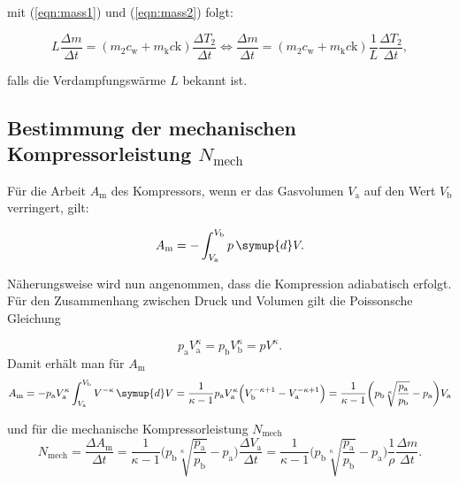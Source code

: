         mit (\ref{eqn:mass1}) und (\ref{eqn:mass2}) folgt:

        \begin{equation}
            L \frac{\Delta m}{\Delta t} = \left( m_2  c_\text{w} + m_\text{k} c\text{k}\right) \frac{\Delta T_2}{\Delta t} \iff \frac{\Delta m}{\Delta t} = \left( m_2  c_\text{w} + m_\text{k} c\text{k}\right) \frac{1}{L} \frac{\Delta T_2}{\Delta t},
        \end{equation}
        
        falls die Verdampfungswärme $L$ bekannt ist.


        \subsection{Bestimmung der mechanischen Kompressorleistung $N_\text{mech}$}

        Für die Arbeit $A_\text{m}$ des Kompressors, wenn er das Gasvolumen $V_\text{a}$ auf den Wert $V_\text{b}$ verringert, gilt:

        \begin{equation}
            A_\text{m} = - \int_{V_\text{a}}^{V_\text{b}} p \, \symup{d}V.
        \end{equation}

Näherungsweise wird nun angenommen, dass die Kompression adiabatisch erfolgt.
Für den Zusammenhang zwischen Druck und Volumen gilt die Poissonsche Gleichung

\begin{equation}
p_\text{a}V^\kappa_\text{a} = p_\text{b}V^\kappa_\text{b} = pV^\kappa.
\end{equation}
Damit erhält man für $A_\text{m}$
\begin{equation}
A_\text{m} = - p_\text{a}V^\kappa_\text{a}\int_{V_\text{a}}^{V_\text{b}} V^{-\kappa} \, \symup{d}V = \frac{1}{\kappa-1}p_\text{a}V^\kappa_\text{a}\Bigl(V^{-\kappa+1}_\text{b}-V^{-\kappa+1}_\text{a}\Bigr) = \frac{1}{\kappa-1}\biggl(p_\text{b}\sqrt[\kappa]{\frac{p_\text{a}}{p_\text{b}}} - p_\text{a}\biggr) V_\text{a}
\end{equation}

und für die mechanische Kompressorleistung $N_\text{mech}$
\begin{equation}
N_\text{mech} = \frac{\Delta A_\text{m}}{\Delta t} = \frac{1}{\kappa-1}\biggl(p_\text{b}\sqrt[\kappa]{\frac{p_\text{a}}{p_\text{b}}} - p_\text{a}\biggr) \frac{\Delta V_\text{a}}{\Delta t} = \frac{1}{\kappa-1}\biggl(p_\text{b}\sqrt[\kappa]{\frac{p_\text{a}}{p_\text{b}}} - p_\text{a}\biggr) \frac{1}{\rho} \frac{\Delta m}{\Delta t}.
\end{equation}

